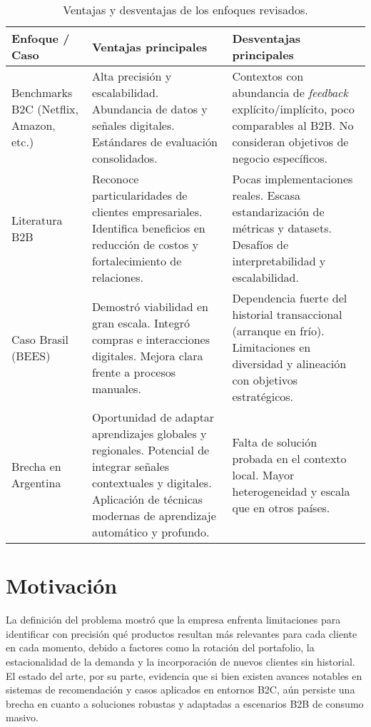 \begin{table}[H]
\centering
\caption[Ventajas y desventajas de enfoques en recomendación]{Ventajas y desventajas de los enfoques revisados.}
\label{tab:estado_arte}
\begin{tabularx}{\textwidth}{>{\hsize=0.5\hsize}X >{\hsize=1.25\hsize}X >{\hsize=1.25\hsize}X}
\toprule
\textbf{Enfoque / Caso} & \textbf{Ventajas principales} & \textbf{Desventajas principales} \\
\midrule
Benchmarks B2C (Netflix, Amazon, etc.) &
Alta precisión y escalabilidad. Abundancia de datos y señales digitales. Estándares de evaluación consolidados. &
Contextos con abundancia de \textit{feedback} explícito/implícito, poco comparables al B2B. No consideran objetivos de negocio específicos. \\
Literatura B2B &
Reconoce particularidades de clientes empresariales. Identifica beneficios en reducción de costos y fortalecimiento de relaciones. &
Pocas implementaciones reales. Escasa estandarización de métricas y datasets. Desafíos de interpretabilidad y escalabilidad. \\
Caso Brasil (BEES) &
Demostró viabilidad en gran escala. Integró compras e interacciones digitales. Mejora clara frente a procesos manuales. &
Dependencia fuerte del historial transaccional (arranque en frío). Limitaciones en diversidad y alineación con objetivos estratégicos. \\
Brecha en Argentina &
Oportunidad de adaptar aprendizajes globales y regionales. Potencial de integrar señales contextuales y digitales. Aplicación de técnicas modernas de aprendizaje automático y profundo. &
Falta de solución probada en el contexto local. Mayor heterogeneidad y escala que en otros países. \\
\bottomrule
\end{tabularx}
\end{table}


\section{Motivación}

La definición del problema mostró que la empresa enfrenta limitaciones para identificar con precisión qué productos resultan más relevantes para cada cliente en cada momento, debido a factores como la rotación del portafolio, la estacionalidad de la demanda y la incorporación de nuevos clientes sin historial. El estado del arte, por su parte, evidencia que si bien existen avances notables en sistemas de recomendación y casos aplicados en entornos B2C, aún persiste una brecha en cuanto a soluciones robustas y adaptadas a escenarios B2B de consumo masivo.

